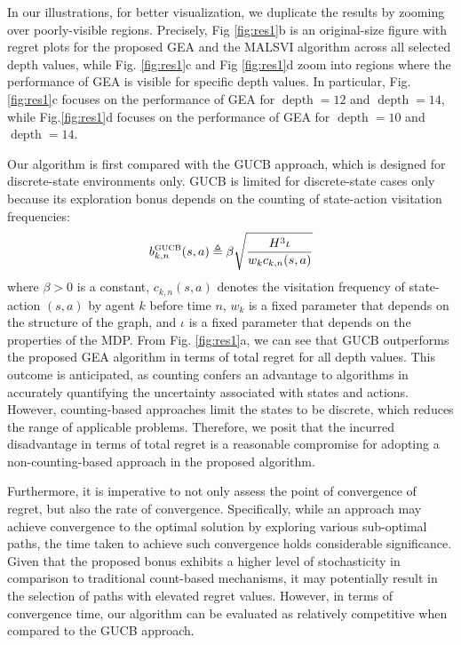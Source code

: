 \documentclass[lettersize,journal]{IEEEtran}
\begin{document}
In our illustrations, for better visualization, we duplicate the results by zooming over poorly-visible regions. Precisely, Fig \ref{fig:res1}b
is an original-size figure with regret plots for the proposed GEA and the MALSVI algorithm across all selected depth values, while Fig. \ref{fig:res1}c and Fig \ref{fig:res1}d zoom into regions where the performance of GEA is visible for specific depth values. In particular, Fig.\ref{fig:res1}c focuses on the performance of GEA for $\operatorname{depth}=12$ and $\operatorname{depth}=14$, while Fig.\ref{fig:res1}d focuses on the performance of GEA for $\operatorname{depth}=10$ and $\operatorname{depth}=14$.  \par 
Our algorithm is first compared with the GUCB approach, which is designed for discrete-state environments only. GUCB is limited for discrete-state cases only because its exploration bonus depends on the counting of state-action visitation frequencies:
\begin{equation}
\label{eq:b_GUCB}
b^{\text{\tiny{GUCB}}}_{k,n}(s,a)\triangleq\beta \sqrt{\frac{H^3\iota } {w_k c_{k,n}(s,a)}}
\end{equation}
where $\beta>0$ is a constant, $c_{k,n}(s,a)$ denotes the visitation frequency of state-action $(s,a)$ by agent $k$ before time $n$, $w_k$ is a fixed parameter that depends on the structure of the graph, and $\iota$ is a fixed parameter that depends on the properties of the MDP. From Fig. \ref{fig:res1}a, we can see that GUCB outperforms the proposed GEA algorithm in terms of total regret for all depth values. This outcome is anticipated, as counting confers an advantage to algorithms in accurately quantifying the uncertainty associated with states and actions. However, counting-based approaches limit the states to be discrete, which reduces the range of applicable problems. Therefore, we posit that the incurred disadvantage in terms of total regret is a reasonable compromise for adopting a non-counting-based approach in the proposed algorithm. \par 
Furthermore, it is imperative to not only assess the point of convergence of regret, but also the rate of convergence. Specifically, while an approach may achieve convergence to the optimal solution by exploring various sub-optimal paths, the time taken to achieve such convergence holds considerable significance. Given that the proposed bonus exhibits a higher level of stochasticity in comparison to traditional count-based mechanisms, it may potentially result in the selection of paths with elevated regret values. However, in terms of convergence time, our algorithm can be evaluated as relatively competitive when compared to the GUCB approach.
\end{document}
